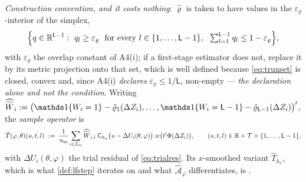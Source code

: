 \begin{definition}
\emph{Construction convention, and it costs nothing}: $\hat\varrho$ is taken to have values in the
$\varepsilon_\varrho$-interior of the simplex,
\begin{equation}\label{eq:trunset}
\Big\{q\in\mathbb{R}^{\mathsf L-1}:\ q_l\ge\varepsilon_\varrho\ \text{ for every }l\in\{1,\dots,\mathsf L-1\},\ \ \textstyle\sum_{l=1}^{\mathsf L-1}q_l\le1-\varepsilon_\varrho\Big\},
\end{equation}
with $\varepsilon_\varrho$ the overlap constant of
A4(i); if a first-stage estimator does not, replace it by its metric projection onto that
set, which is well defined because \eqref{eq:trunset} is closed, convex and, since
A4(i) \emph{declares} $\varepsilon_\varrho\le1/\mathsf L$, non-empty --- \emph{the declaration alone and
not the condition}.
Writing $\widehat{\widetilde W}_{i}:=\big(\un\{W_i=1\}-\hat\varrho_1(\Delta Z_i),\dots,\un\{W_i=\mathsf L-1\}-\hat\varrho_{\mathsf L-1}(\Delta Z_i)\big)'$,
the \emph{sample operator} is
\begin{equation}\label{eq:hatT}
\hat T(\varphi,\theta)(u,t,l)\;:=\;\frac1{n_{\mathrm m}}\sum_{i\in\mathcal I_m}
\widehat{\widetilde W}_{i,l}\;\mathsf C_{h_u}\big(u-\Delta U_i(\theta,\varphi)\big)\;w\big(t'\Phi(\Delta Z_i)\big),
\qquad(u,t,l)\in\mathbb{R}\times\mathcal T\times\{1,\dots,\mathsf L-1\} ,
\end{equation}
with $\Delta U_i(\theta,\varphi)$ the trial residual of \eqref{eq:trialres}. Its $x$-smoothed variant
$\hat T_{h_x}$, which is what \cref{def:lfstep} iterates on and what
$\hat{\mathcal A}_\varphi$ differentiates, is .
\end{definition}

